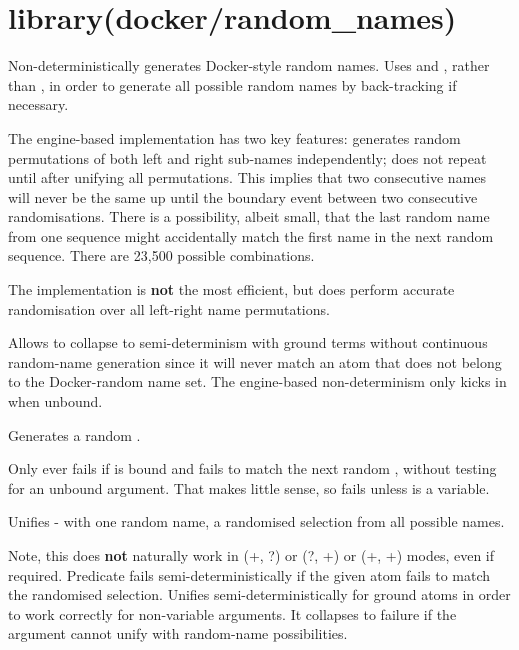 \begin{description}
\end{description}

\chapter{library(docker/random_names)}\label{sec:randomnames}

\begin{description}
Non-deterministically generates Docker-style random names. Uses
 and , rather than , in
order to generate all possible random names by back-tracking if
necessary.

The engine-based implementation has two key features: generates
random permutations of both left and right sub-names independently;
does not repeat until after unifying all permutations. This implies
that two consecutive names will never be the same up until the
boundary event between two consecutive randomisations. There is a
possibility, albeit small, that the last random name from one
sequence might accidentally match the first name in the next random
sequence. There are 23,500 possible combinations.

The implementation is \textbf{not} the most efficient, but does perform
accurate randomisation over all left-right name permutations.

Allows  to collapse to semi-determinism with ground terms
without continuous random-name generation since it will never match
an atom that does not belong to the Docker-random name set. The
engine-based non-determinism only kicks in when  unbound.

Generates a random .

Only ever fails if  is bound and fails to match the next random
, without testing for an unbound argument. That makes little
sense, so fails unless  is a variable.

Unifies - with one random name, a randomised selection from
all possible names.

Note, this does \textbf{not} naturally work in (+, ?) or (?, +) or (+, +)
modes, even if required. Predicate  fails
semi-deterministically if the given atom fails to match the
randomised selection. Unifies semi-deterministically for ground
atoms in order to work correctly for non-variable arguments. It
collapses to failure if the argument cannot unify with random-name
possibilities.
\end{description}

